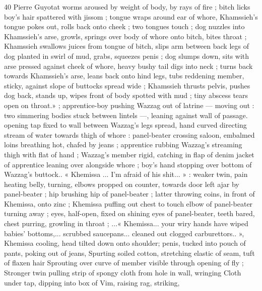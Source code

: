 40 Pierre Guyotat
worms aroused by weight of body, by rays of fire ; bitch licks boy's
hair spattered with jissom ; tongue wraps around ear of whore,
Khamssieh's tongue pokes out, rolls back onto cheek ; two tongues
touch ; dog nuzzles into Khamssieh’s arse, growls, springs over body
of whore onto bitch, bites throat ; Khamssieh swallows juices from
tongue of bitch, slips arm between back legs of dog planted in swirl
of mud, grabs, squeezes penis ; dog slumps down, sits with arse
pressed against cheek of whore, heavy bushy tail digs into neck ;
turns back towards Khamssieh’s arse, leans back onto hind legs,
tubs reddening member, sticky, against slope of buttocks spread
wide ; Khamssieh thrusts pelvis, pushes dog back, stands up, wipes
front of body spotted with mud ; tiny abscess tears open on throat.»
; apprentice-boy pushing Wazzag out of latrine — moving out : two
simmering bodies stuck between lintels —, leaning against wall of
passage. opening tap fixed to wall between Wazzag's legs spread,
hand curved directing stream of water towards thigh of whore :
panel-beater crossing saloon, embalmed loins breathing hot, chafed
by jeans ; apprentice rubbing Wazzag's streaming thigh with flat of
hand ; Wazzag’s member rigid, catching in flap of denim jacket of
apprentice leaning over alongside whore ; boy's hand stopping over
bottom of Wazzag’s buttock.. « Khemissa ... I'm afraid of his shit... »
: weaker twin, pain heating belly, turning, elbows propped on
counter, towards door left ajar by panel-beater ; hip brushing hip of
panel-beater ; latter throwing coins, in front of Khemissa, onto zinc ;
Khemissa puffing out chest to touch elbow of panel-beater turning
away ; eyes, half-open, fixed on shining eyes of panel-beater, teeth
bared, chest purring, growling in throat ; ...« Khemissa... your wiry
hands have wiped babies’ bottoms,... scrubbed saucepans... cleaned
out clogged carburettors.. », Khemissa cooling, head tilted down onto
shoulder; penis, tucked into pouch of pants, poking out of jeans,
Spurting soiled cotton, stretching elastic of seam, tuft of flaxen hair
Sprouting over curve of member visible through opening of fly ;
Stronger twin pulling strip of spongy cloth from hole in wall, wringing
Cloth under tap, dipping into box of Vim, raising rag, striking,

